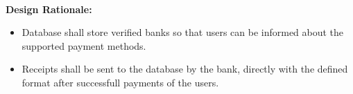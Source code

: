 \documentclass[11pt]{article}
\begin{document}
    \textbf{\\Design Rationale:}
    \begin{itemize}
       \item Database shall store verified banks so that users can be informed about the supported payment methods.
       \item Receipts shall be sent to the database by the bank, directly with the defined format after successfull payments of the users.
    \end{itemize}
\end{document}
